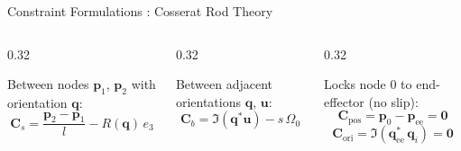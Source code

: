 \documentclass[aspectratio=169]{beamer}
\begin{document}
\begin{frame}{Constraint Formulations : Cosserat Rod Theory}

  \begin{columns}[T]

    \begin{column}{0.32\textwidth}
      \begin{tcolorbox}[constraintbox, title={Stretch / Shear}]
        \small
        Between nodes $\mathbf{p}_1$, $\mathbf{p}_2$ with orientation $\mathbf{q}$:
        \begin{equation*}
          \mathbf{C}_s = \frac{\mathbf{p}_2 - \mathbf{p}_1}{l} - R(\mathbf{q})\,e_3
        \end{equation*}
        \vspace{2pt}
      \end{tcolorbox}
    \end{column}

    \begin{column}{0.32\textwidth}
      \begin{tcolorbox}[constraintbox, title={Bending / Twist}]
        \small
        Between adjacent orientations $\mathbf{q}$, $\mathbf{u}$:
        \begin{equation*}
          \mathbf{C}_b = \Im(\mathbf{q}^*\mathbf{u}) - s\,\Omega_0
        \end{equation*}
        \vspace{2pt}
       
      \end{tcolorbox}
    \end{column}

    \begin{column}{0.32\textwidth}
      \begin{tcolorbox}[constraintbox, title={Fixed Node to TCP}]
        \small
        Locks node 0 to end-effector (no slip):
        \begin{equation*}
          \mathbf{C}_\text{pos} = \mathbf{p}_0 - \mathbf{p}_\text{ee} = \mathbf{0}
        \end{equation*}
        \begin{equation*}
          \mathbf{C}_\text{ori} = \Im\!\left(\mathbf{q}_\text{ee}^*\,\mathbf{q}_i\right) = \mathbf{0}
        \end{equation*}
        \vspace{2pt}
      \end{tcolorbox}
    \end{column}
    


\end{columns}
\end{frame}
\end{document}
